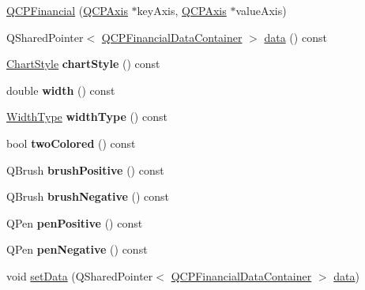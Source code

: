 \begin{DoxyCompactItemize}
\item 
\hyperlink{class_q_c_p_financial_a4702d5248feeb9d1ec6e3ce725b10b32}{Q\+C\+P\+Financial} (\hyperlink{class_q_c_p_axis}{Q\+C\+P\+Axis} $\ast$key\+Axis, \hyperlink{class_q_c_p_axis}{Q\+C\+P\+Axis} $\ast$value\+Axis)
\item 
Q\+Shared\+Pointer$<$ \hyperlink{class_q_c_p_data_container}{Q\+C\+P\+Financial\+Data\+Container} $>$ \hyperlink{class_q_c_p_financial_aec3f666271cf48bd7b87d84fe3f8c074}{data} () const
\item 
\mbox{\label{class_q_c_p_financial_a5243371c1fde30fdae00555d7760ec2d}} 
\hyperlink{class_q_c_p_financial_a0f800e21ee98d646dfc6f8f89d10ebfb}{Chart\+Style} {\bfseries chart\+Style} () const
\item 
\mbox{\label{class_q_c_p_financial_a12548f13658eda5833204ef60f524870}} 
double {\bfseries width} () const
\item 
\mbox{\label{class_q_c_p_financial_a7afa595e63800c072701e6e57d4ca9e2}} 
\hyperlink{class_q_c_p_financial_aef1761dda71a53dc5269685e9e492626}{Width\+Type} {\bfseries width\+Type} () const
\item 
\mbox{\label{class_q_c_p_financial_afd4b51de5be8e53776b649f9877a50e6}} 
bool {\bfseries two\+Colored} () const
\item 
\mbox{\label{class_q_c_p_financial_ae922e75f3d5b8854369ac0bf1ebfb053}} 
Q\+Brush {\bfseries brush\+Positive} () const
\item 
\mbox{\label{class_q_c_p_financial_ad4fdc5bc21f5eb17070e043bd4a35f53}} 
Q\+Brush {\bfseries brush\+Negative} () const
\item 
\mbox{\label{class_q_c_p_financial_ae803fe25fdd6f0acacde4539590795ed}} 
Q\+Pen {\bfseries pen\+Positive} () const
\item 
\mbox{\label{class_q_c_p_financial_a25d9a8f256e5ddcba56b6e2e7e968653}} 
Q\+Pen {\bfseries pen\+Negative} () const
\item 
void \hyperlink{class_q_c_p_financial_a72089e75b8a50d18097526c3c79fdb85}{set\+Data} (Q\+Shared\+Pointer$<$ \hyperlink{class_q_c_p_data_container}{Q\+C\+P\+Financial\+Data\+Container} $>$ \hyperlink{class_q_c_p_financial_aec3f666271cf48bd7b87d84fe3f8c074}{data})

\end{DoxyCompactItemize}
